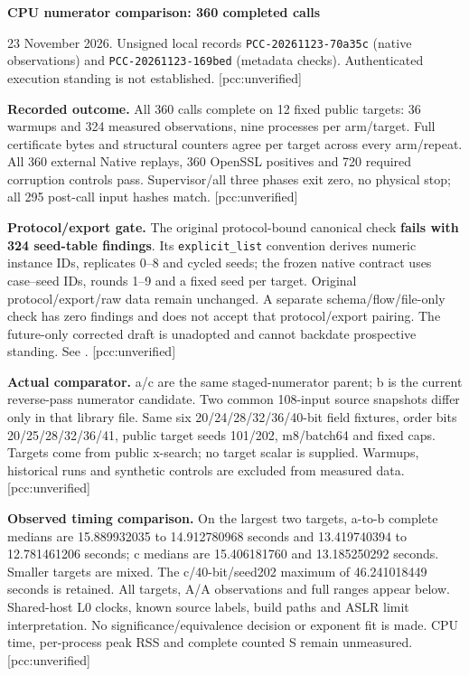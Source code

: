 \documentclass[10pt]{article}
\begin{document}
{\Large\bfseries CPU numerator comparison: 360 completed calls}

23 November 2026. Unsigned local records \texttt{PCC-20261123-70a35c}
(native observations) and \texttt{PCC-20261123-169bed} (metadata checks).
Authenticated execution standing is not established. [pcc:unverified]

\textbf{Recorded outcome.} All 360 calls complete on 12 fixed public targets:
36 warmups and 324 measured observations, nine processes per arm/target.
Full certificate bytes and structural counters agree per target across every
arm/repeat. All 360 external Native replays, 360 OpenSSL positives and 720
required corruption controls pass. Supervisor/all three phases exit zero, no
physical stop; all 295 post-call input hashes match. [pcc:unverified]

\textbf{Protocol/export gate.} The original protocol-bound canonical check
\textbf{fails with 324 seed-table findings}. Its \texttt{explicit\_list}
convention derives numeric instance IDs, replicates 0--8 and cycled seeds;
the frozen native contract uses case--seed IDs, rounds 1--9 and a fixed seed
per target. Original protocol/export/raw data remain unchanged. A separate
schema/flow/file-only check has zero findings and does not accept that
protocol/export pairing. The future-only corrected draft is unadopted and
cannot backdate prospective standing. See .
[pcc:unverified]

\textbf{Actual comparator.} a/c are the same staged-numerator parent; b is the
current reverse-pass numerator candidate. Two common 108-input source snapshots
differ only in that library file. Same six 20/24/28/32/36/40-bit field fixtures,
order bits 20/25/28/32/36/41, public target seeds 101/202, m8/batch64 and fixed
caps. Targets come from public x-search; no target scalar is supplied. Warmups,
historical runs and synthetic controls are excluded from measured data.
[pcc:unverified]

\textbf{Observed timing comparison.} On the largest two targets, a-to-b complete
medians are 15.889932035 to 14.912780968 seconds and 13.419740394 to
12.781461206 seconds; c medians are 15.406181760 and 13.185250292 seconds.
Smaller targets are mixed. The c/40-bit/seed202 maximum of 46.241018449 seconds
is retained. All targets, A/A observations and full ranges appear below.
Shared-host L0 clocks, known source labels, build paths and ASLR limit
interpretation. No significance/equivalence decision or exponent fit is made.
CPU time, per-process peak RSS and complete counted S remain unmeasured.
[pcc:unverified]
\end{document}
